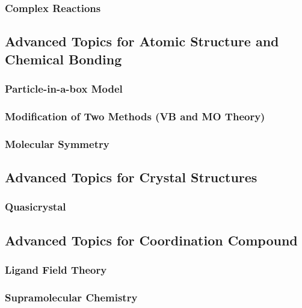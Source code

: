 \subsubsection{Complex Reactions}

\newpage
\subsection{Advanced Topics for Atomic Structure and Chemical Bonding}
\subsubsection{Particle-in-a-box Model}
\subsubsection{Modification of Two Methods (VB and MO Theory)}
\subsubsection{Molecular Symmetry}

\newpage
\subsection{Advanced Topics for Crystal Structures}
\subsubsection{Quasicrystal}

\newpage
\subsection{Advanced Topics for Coordination Compound}
\subsubsection{Ligand Field Theory}
\subsubsection{Supramolecular Chemistry}
